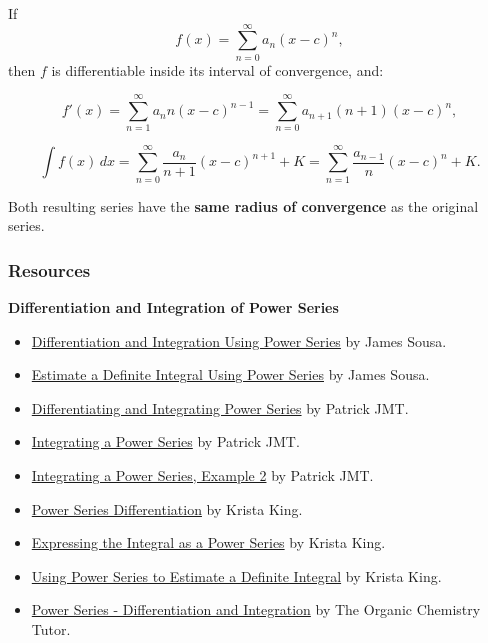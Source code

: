 If
\[
f(x) = \sum_{n=0}^{\infty} a_n (x-c)^n,
\]
then $f$ is differentiable inside its interval of convergence, and:

\[
f'(x) = \sum_{n=1}^{\infty} a_n n (x-c)^{n-1}
= \sum_{n=0}^{\infty} a_{n+1}(n+1)(x-c)^n,
\]

\[
\int f(x)\,dx
= \sum_{n=0}^{\infty} \frac{a_n}{n+1}(x-c)^{n+1} + K
= \sum_{n=1}^{\infty} \frac{a_{n-1}}{n}(x-c)^n + K.
\]

Both resulting series have the \textbf{same radius of convergence} as the original series.

\subsubsection{Resources}
\label{sss:reso-power-diff}

\textbf{Differentiation and Integration of Power Series}

\begin{itemize}
\item \href{https://www.youtube.com/watch?v=zCQuEN7TFNE}{Differentiation and Integration Using Power Series} by James Sousa.
\item \href{https://www.youtube.com/watch?v=Ap47feo6xUM}{Estimate a Definite Integral Using Power Series} by James Sousa.
\item \href{https://www.youtube.com/watch?v=qPl9nr8my2Q}{Differentiating and Integrating Power Series} by Patrick JMT.
\item \href{https://www.youtube.com/watch?v=q12rXAMfEXw}{Integrating a Power Series} by Patrick JMT.
\item \href{https://www.youtube.com/watch?v=mGAE8CWH45M}{Integrating a Power Series, Example 2} by Patrick JMT.
\item \href{https://www.youtube.com/watch?v=2dQ4UvCIBV8}{Power Series Differentiation} by Krista King.
\item \href{https://www.youtube.com/watch?v=5p-EH8vP_bU}{Expressing the Integral as a Power Series} by Krista King.
\item \href{https://www.youtube.com/watch?v=GHvPArQIXSg}{Using Power Series to Estimate a Definite Integral} by Krista King.
\item \href{https://www.youtube.com/watch?v=nD6hai32ykQ}{Power Series - Differentiation and Integration} by The Organic Chemistry Tutor.
\end{itemize}

